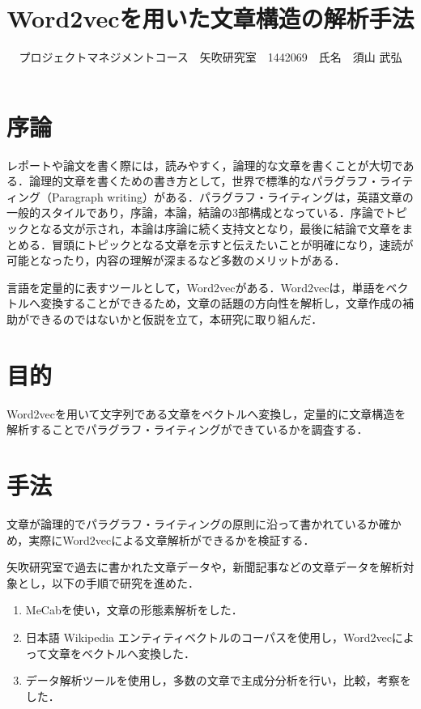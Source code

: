 \documentclass[uplatex,twocolumn,dvipdfmx]{jsarticle}
\title{\vspace{-5mm}\fontsize{14pt}{0pt}\selectfont Word2vecを用いた文章構造の解析手法}
\author{\normalsize プロジェクトマネジメントコース　矢吹研究室　1442069　氏名　須山 武弘}
\date{}
\begin{document}
\fontsize{10.5pt}{\baselineskip}\selectfont
\maketitle





\section{序論}\label{序論}
レポートや論文を書く際には，読みやすく，論理的な文章を書くことが大切である．論理的文章を書くための書き方として，世界で標準的なパラグラフ・ライティング（Paragraph writing）がある\cite{02}．パラグラフ・ライティングは，英語文章の一般的スタイルであり，序論，本論，結論の3部構成となっている．序論でトピックとなる文が示され，本論は序論に続く支持文となり，最後に結論で文章をまとめる．冒頭にトピックとなる文章を示すと伝えたいことが明確になり，速読が可能となったり，内容の理解が深まるなど多数のメリットがある．

言語を定量的に表すツールとして，Word2vecがある．Word2vecは，単語をベクトルへ変換することができるため，文章の話題の方向性を解析し，文章作成の補助ができるのではないかと仮説を立て，本研究に取り組んだ\cite{01}．

\section{目的}
Word2vecを用いて文字列である文章をベクトルへ変換し，定量的に文章構造を解析することでパラグラフ・ライティングができているかを調査する．

\section{手法}

文章が論理的でパラグラフ・ライティングの原則に沿って書かれているか確かめ，実際にWord2vecによる文章解析ができるかを検証する．

矢吹研究室で過去に書かれた文章データや，新聞記事などの文章データを解析対象とし，以下の手順で研究を進めた．
\begin{enumerate}
 \item MeCabを使い，文章の形態素解析をした．
 \item 日本語 Wikipedia エンティティベクトルのコーパスを使用し，Word2vecによって文章をベクトルへ変換した．
 \item データ解析ツールを使用し，多数の文章で主成分分析を行い，比較，考察をした．
\end{enumerate}
\end{document}
